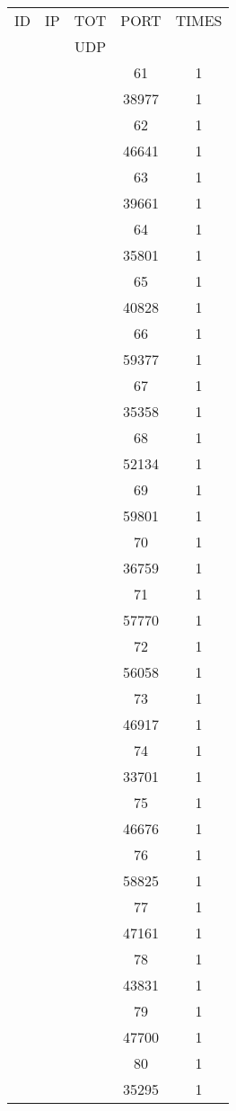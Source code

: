 \documentclass[a4paper]{scrartcl}
\begin{document}
\begin{minipage}[b]{0.5\linewidth}
\begin{tabular}{| c | c | c | c | c |}
\hline
ID & IP & TOT & PORT & TIMES \\ 
   &    & UDP &      &       \\ 
\hline
& & & 61 & 1 \\ & & & 38977 & 1 \\ & & & 62 & 1 \\ & & & 46641 & 1 \\ & & & 63 & 1 \\ & & & 39661 & 1 \\ & & & 64 & 1 \\ & & & 35801 & 1 \\ & & & 65 & 1 \\ & & & 40828 & 1 \\ & & & 66 & 1 \\ & & & 59377 & 1 \\ & & & 67 & 1 \\ & & & 35358 & 1 \\ & & & 68 & 1 \\ & & & 52134 & 1 \\ & & & 69 & 1 \\ & & & 59801 & 1 \\ & & & 70 & 1 \\ & & & 36759 & 1 \\ & & & 71 & 1 \\ & & & 57770 & 1 \\ & & & 72 & 1 \\ & & & 56058 & 1 \\ & & & 73 & 1 \\ & & & 46917 & 1 \\ & & & 74 & 1 \\ & & & 33701 & 1 \\ & & & 75 & 1 \\ & & & 46676 & 1 \\ & & & 76 & 1 \\ & & & 58825 & 1 \\ & & & 77 & 1 \\ & & & 47161 & 1 \\ & & & 78 & 1 \\ & & & 43831 & 1 \\ & & & 79 & 1 \\ & & & 47700 & 1 \\ & & & 80 & 1 \\ & & & 35295 & 1 \\ \hline\end{tabular}\end{minipage} \hfill\begin{minipage}[b]{0.5\linewidth}\begin{tabular}{| c | c | c | c | c |}

\end{tabular}
\end{minipage}
\end{document}
